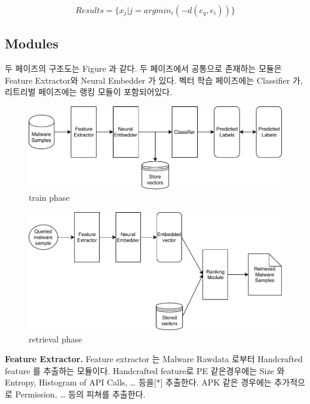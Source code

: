 \[
Results = \{x_j | j = argmin_i( {-d(e_q, e_i)} )  \}
\]


\subsection{Modules}

두 페이즈의 구조도는 Figure 과 같다. 두 페이즈에서 공통으로 존재하는 모듈은 Feature Extractor와 Neural Embedder 가 있다. 벡터 학습 페이즈에는 Classifier 가, 리트리벌 페이즈에는 랭킹 모듈이 포함되어있다. 
\begin{figure}
  \includegraphics[width=\linewidth]{../figures/train_phase.pdf}
  \caption{train phase}
  \label{fig:one}
\end{figure}
\begin{figure}
  \includegraphics[width=\linewidth]{../figures/retrieval_phase.pdf}
  \caption{retrieval phase}
  \label{fig:two}
\end{figure}


\textbf{Feature Extractor. }
Feature extractor 는 Malware Rawdata 로부터 Handcrafted feature 를 추출하는 모듈이다. Handcrafted feature로 PE 같은경우에는 Size 와 Entropy, Histogram of API Calls, … 등을[*] 추출한다. APK 같은 경우에는 추가적으로 Permission,  … 등의 피쳐를 추출한다. 



